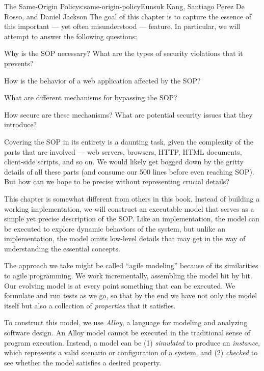 \begin{aosachapter}{The Same-Origin Policy}{s:same-origin-policy}{Eunsuk Kang, Santiago Perez De Rosso, and Daniel Jackson}
The goal of this chapter is to capture the essence of this important ---
yet often misunderstood --- feature. In particular, we will attempt to
answer the following questions:

\begin{aosaitemize}

\item
  Why is the SOP necessary? What are the types of security violations
  that it prevents?
\item
  How is the behavior of a web application affected by the SOP?
\item
  What are different mechanisms for bypassing the SOP?
\item
  How secure are these mechanisms? What are potential security issues
  that they introduce?
\end{aosaitemize}

Covering the SOP in its entirety is a daunting task, given the
complexity of the parts that are involved --- web servers, browsers,
HTTP, HTML documents, client-side scripts, and so on. We would likely
get bogged down by the gritty details of all these parts (and consume
our 500 lines before even reaching SOP). But how can we hope to be
precise without representing crucial details?

\label{modeling-with-alloy}

This chapter is somewhat different from others in this book. Instead of
building a working implementation, we will construct an executable model
that serves as a simple yet precise description of the SOP. Like an
implementation, the model can be executed to explore dynamic behaviors
of the system, but unlike an implementation, the model omits low-level
details that may get in the way of understanding the essential concepts.

The approach we take might be called ``agile modeling'' because of its
similarities to agile programming. We work incrementally, assembling the
model bit by bit. Our evolving model is at every point something that
can be executed. We formulate and run tests as we go, so that by the end
we have not only the model itself but also a collection of
\emph{properties} that it satisfies.

To construct this model, we use \emph{Alloy}, a language for modeling
and analyzing software design. An Alloy model cannot be executed in the
traditional sense of program execution. Instead, a model can be (1)
\emph{simulated} to produce an \emph{instance}, which represents a valid
scenario or configuration of a system, and (2) \emph{checked} to see
whether the model satisfies a desired property.


\end{aosachapter}
